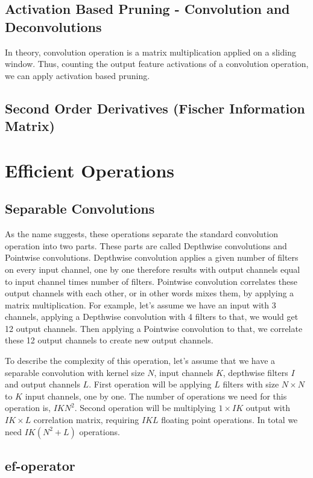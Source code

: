 \subsection{Activation Based Pruning - Convolution and Deconvolutions}
In theory, convolution operation is a matrix multiplication applied on a sliding window. Thus, counting the output feature activations of a convolution operation, we can apply activation based pruning. 

\subsection{Second Order Derivatives (Fischer Information Matrix)}

\section{Efficient Operations}
\subsection{Separable Convolutions}
As the name suggests, these operations separate the standard convolution operation into two parts. These parts are called Depthwise convolutions and Pointwise convolutions. Depthwise convolution applies a given number of filters on every input channel, one by one therefore results with output channels equal to input channel times number of filters. Pointwise convolution correlates these output channels with each other, or in other words mixes them, by applying a matrix multiplication. For example, let's assume we have an input with 3 channels, applying a Depthwise convolution with 4 filters to that, we would get 12 output channels. Then applying a Pointwise convolution to that, we correlate these 12 output channels to create new output channels. 

To describe the complexity of this operation, let's assume that we have a separable convolution with kernel size $N$, input channels $K$, depthwise filters $I$ and output channels $L$. First operation will be applying $L$ filters with size $N \times N$ to $K$ input channels, one by one. The number of operations we need for this operation is, $IKN^2$. Second operation will be multiplying $1 \times IK$ output with $IK \times L$ correlation matrix, requiring $IKL$ floating point operations. In total we need $IK(N^2+L)$ operations. 
\subsection{ef-operator}

